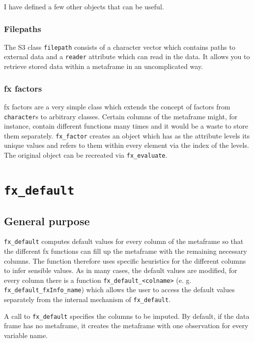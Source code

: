 \documentclass[]{report}
\theoremstyle{definition}
\theoremstyle{definition}
\theoremstyle{definition}
\theoremstyle{remark}
\begin{document}
I have defined a few other objects that can be useful.

\subsubsection{Filepaths}\label{filepaths}

The S3 class \texttt{filepath} consists of a character vector which
contains paths to external data and a \texttt{reader} attribute which
can read in the data. It allows you to retrieve stored data within a
metaframe in an uncomplicated way.

\subsubsection{fx factors}\label{fx-factors}

fx factors are a very simple class which extends the concept of factors
from \texttt{character}s to arbitrary classes. Certain columns of the
metaframe might, for instance, contain different functions many times
and it would be a waste to store them separately. \texttt{fx\_factor}
creates an object which has as the attribute levels its unique values
and refers to them within every element via the index of the levels. The
original object can be recreated via \texttt{fx\_evaluate}.

\section{\texorpdfstring{\texttt{fx\_default}}{fx\_default}}\label{fx_default}

\subsection{General purpose}\label{general-purpose}

\texttt{fx\_default} computes default values for every column of the
metaframe so that the different fx functions can fill up the metaframe
with the remaining necessary columns. The function therefore uses
specific heuristics for the different columns to infer sensible values.
As in many cases, the default values are modified, for every column
there is a function
\texttt{fx\_default\_\textless{}colname\textgreater{}} (e. g.
\texttt{fx\_default\_fxInfo\_name}) which allows the user to access the
default values separately from the internal mechanism of
\texttt{fx\_default}.

A call to \texttt{fx\_default} specifies the columns to be imputed. By
default, if the data frame has no metaframe, it creates the metaframe
with one observation for every variable name.
\end{document}

